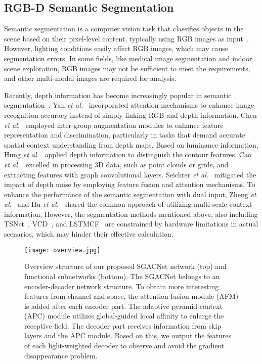 \documentclass[journal,twoside,web]{ieeecolor}
\begin{document}
\subsection{RGB-D Semantic Segmentation}
Semantic segmentation is a computer vision task that classifies objects in the scene based on their pixel-level content, typically using RGB images as input~\cite{DRD, DSNet, FDNet, MTI-Net, RefineNet,DCNV2}. However, lighting conditions easily affect RGB images, which may cause segmentation errors. In some fields, like medical image segmentation and indoor scene exploration, RGB images may not be sufficient to meet the requirements, and other multi-modal images are required for analysis.

Recently, depth information has become increasingly popular in semantic segmentation~\cite{SGNet, LDFNet,3DGNN, ESANet, MCN-DRM, ACNet, VCD, LSTMCF}. Yan \textit{et al.}~\cite{RAFNet} incorporated attention mechanisms to enhance image recognition accuracy instead of simply linking RGB and depth information. Chen \textit{et al.}~\cite{ SGNet } employed inter-group augmentation modules to enhance feature representation and discrimination, particularly in tasks that demand accurate spatial context understanding from depth maps. Based on luminance information, Hung \textit{et al.}~\cite{LDFNet} applied depth information to distinguish the contour features. Cao \textit{et al.}~\cite{3DGNN } excelled in processing 3D data, such as point clouds or grids, and extracting features with graph convolutional layers. Seichter \textit{et al.}~\cite{ESANet} mitigated the impact of depth noise by employing feature fusion and attention mechanisms. To enhance the performance of the semantic segmentation with dual input, Zheng \textit{et al.}~\cite{ MCN-DRM} and Hu \textit{et al.}~\cite{ ACNet} shared the common approach of utilizing multi-scale context information. However, the segmentation methods mentioned above, also including TSNet~\cite{ TSNet }, VCD~\cite{VCD}, and LSTMCF~\cite{LSTMCF} are constrained by hardware limitations in actual scenarios, which may hinder their effective calculation.
\begin{figure*}[!t]
	\centering
	\texttt{[image: overview.jpg]}
	\caption{Overview structure of our proposed SGACNet network (top) and functional subnetworks (bottom). The SGACNet belongs to an encoder-decoder network structure. To obtain more interesting features from channel and space, the attention fusion module (AFM) is added after each encoder part. The adaptive pyramid context (APC) module utilizes global-guided local affinity to enlarge the receptive field. The decoder part receives information from skip layers and the APC module. Based on this, we output the features of each light-weighted decoder to observe and avoid the gradient disappearance problem.}
	\label{Framework}
\end{figure*}
\end{document}
